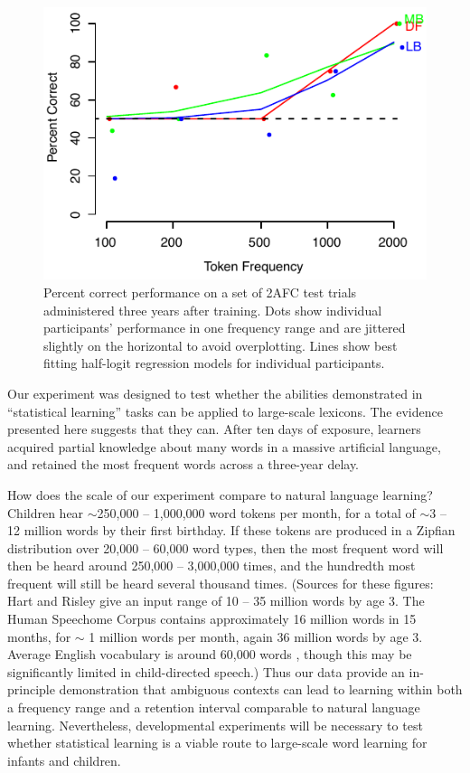 \documentclass[10pt]{article}
\begin{document}
\begin{figure}[t]
\begin{center}
\includegraphics{mseg2afc_col.pdf}
\caption{\label{fig:2afc} Percent correct performance on a set of 2AFC test trials administered three years after training. Dots show individual participants' performance in one frequency range and are jittered slightly on the horizontal to avoid overplotting. Lines show best fitting half-logit regression models for individual participants.}
\end{center}
\end{figure}

Our experiment was designed to test whether the abilities demonstrated in ``statistical learning'' tasks can be applied to large-scale lexicons. The evidence presented here suggests that they can. After ten days of exposure, learners acquired partial knowledge about many words in a massive artificial language, and retained the most frequent words across a three-year delay.

How does the scale of our experiment compare to natural language learning? Children hear $\sim$250,000 -- 1,000,000 word tokens per month, for a total of $\sim$3 -- 12 million words by their first birthday. If these tokens are produced in a Zipfian distribution over 20,000 -- 60,000 word types, then the most frequent word will then be heard around 250,000 -- 3,000,000 times, and the hundredth most frequent will still be heard several thousand times. (Sources for these figures: Hart and Risley \cite{hart1995} give an input range of 10 -- 35 million words by age 3. The Human Speechome Corpus \cite{roy2009} contains approximately 16 million words in 15 months, for $\sim$ 1 million words per month, again 36 million words by age 3. Average English vocabulary is around 60,000 words \cite{pinker1994}, though this may be significantly limited in child-directed speech.) Thus our data provide an in-principle demonstration that ambiguous contexts can lead to learning within both a frequency range and a retention interval comparable to natural language learning. Nevertheless, developmental experiments will be necessary to test whether statistical learning is a viable route to large-scale word learning for infants and children.
\end{document}
